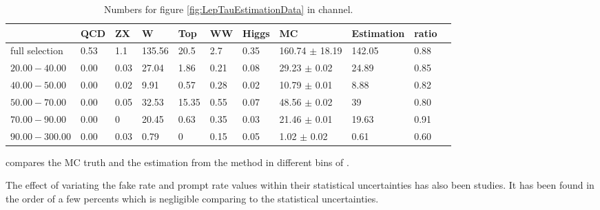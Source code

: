 \begin{table}[!Hhtb]
\begin{center}
\begin{tabular}{lllllllllll}
\hline
\hline
               &  QCD     &  ZX     &  W     & Top      & WW      & Higgs     & MC                 &  Estimation &ratio        &      \\             
\hline
\hline
full selection & 0.53     & 1.1     & 135.56 & 20.5     & 2.7     & 0.35       & 160.74 $\pm$ 18.19 & 142.05    &  0.88 \\
$20.00-40.00$  & 0.00     & 0.03    & 27.04  & 1.86     & 0.21    & 0.08       & 29.23 $\pm$ 0.02   & 24.89     &  0.85 \\
$40.00-50.00$  & 0.00     & 0.02    & 9.91   & 0.57     & 0.28    & 0.02       & 10.79 $\pm$ 0.01   & 8.88      &  0.82 \\
$50.00-70.00$  & 0.00     & 0.05    & 32.53  & 15.35    & 0.55    & 0.07       & 48.56 $\pm$ 0.02   & 39        &  0.80 \\
$70.00-90.00$  & 0.00     & 0       & 20.45  & 0.63     & 0.35    & 0.03       & 21.46 $\pm$ 0.01   & 19.63     &  0.91 \\
$90.00-300.00$ & 0.00     & 0.03    & 0.79   & 0        & 0.15    & 0.05       & 1.02 $\pm$ 0.02    & 0.61      &   0.60\\
\hline
\hline
\end{tabular}
\caption{Numbers for figure \ref{fig:LepTauEstimationData} in \muTau channel.}
\label{tbl:LepTauEstimationData}
\end{center}
\end{table}
compares the MC truth and the estimation from the method in different bins of \mttwo.

The effect of variating the fake rate and prompt rate values within their statistical uncertainties has also been studies. It has been found in the order of a few percents which is negligible comparing to the statistical uncertainties.
